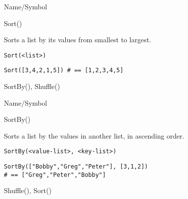 \rl


\begin{desc}{Name/Symbol}
\item[Name/Symbol] 	Sort()

\item[Description] 	Sorts a list by its values from smallest to largest.

\item[Usage]       	
\begin{verbatim}
Sort(<list>)
\end{verbatim}

\item[Example]
\begin{verbatim}
Sort([3,4,2,1,5]) # == [1,2,3,4,5]
\end{verbatim}

\item[See Also]    	SortBy(), Shuffle()
\end{desc}

\rl


\begin{desc}{Name/Symbol}
\item[Name/Symbol] 	SortBy()

\item[Description] 	Sorts a list by the values in another list, in ascending
		order.

\item[Usage]
\begin{verbatim}
SortBy(<value-list>, <key-list>)
\end{verbatim}

\item[Example]
\begin{verbatim}
SortBy(["Bobby","Greg","Peter"], [3,1,2]) 
# == ["Greg","Peter","Bobby"]
\end{verbatim}

\item[See Also]    	Shuffle(), Sort()
\end{desc}

\rl



